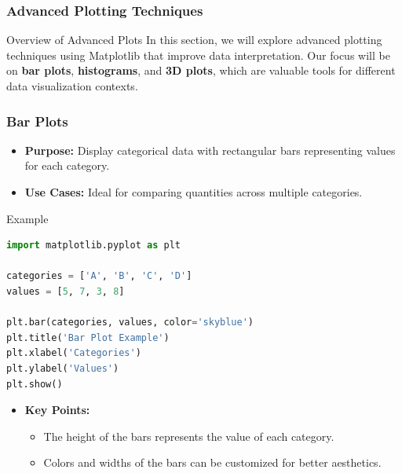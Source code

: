 \documentclass{beamer}
\begin{document}
\begin{frame}
    \frametitle{Advanced Plotting Techniques}
    \begin{block}{Overview of Advanced Plots}
        In this section, we will explore advanced plotting techniques using Matplotlib that improve data interpretation. 
        Our focus will be on \textbf{bar plots}, \textbf{histograms}, and \textbf{3D plots}, which are valuable tools for different data visualization contexts.
    \end{block}
\end{frame}

\begin{frame}[fragile]
    \frametitle{Bar Plots}
    \begin{itemize}
        \item \textbf{Purpose:} Display categorical data with rectangular bars representing values for each category.
        \item \textbf{Use Cases:} Ideal for comparing quantities across multiple categories.
    \end{itemize}
    
    \begin{block}{Example}
        \begin{lstlisting}[language=Python]
import matplotlib.pyplot as plt

categories = ['A', 'B', 'C', 'D']
values = [5, 7, 3, 8]

plt.bar(categories, values, color='skyblue')
plt.title('Bar Plot Example')
plt.xlabel('Categories')
plt.ylabel('Values')
plt.show()
        \end{lstlisting}
    \end{block}
    
    \begin{itemize}
        \item \textbf{Key Points:}
        \begin{itemize}
            \item The height of the bars represents the value of each category.
            \item Colors and widths of the bars can be customized for better aesthetics.
        \end{itemize}
    \end{itemize}
\end{frame}
\end{document}
